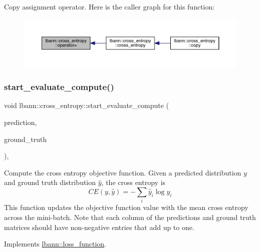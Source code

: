 Copy assignment operator. Here is the caller graph for this function\+:\nopagebreak
\begin{figure}[H]
\begin{center}
\leavevmode
\includegraphics[width=350pt]{classlbann_1_1cross__entropy_a818f473e9af3e417dfdf2c79f8f2c2af_icgraph}
\end{center}
\end{figure}
\mbox{\label{classlbann_1_1cross__entropy_a5167b7709499516c6a4dbebfc561f6a7}} 
\subsubsection{\texorpdfstring{start\+\_\+evaluate\+\_\+compute()}{start\_evaluate\_compute()}}
{\footnotesize\ttfamily void lbann\+::cross\+\_\+entropy\+::start\+\_\+evaluate\+\_\+compute (\begin{DoxyParamCaption}\item[{const \hyperlink{base_8hpp_a9a697a504ae84010e7439ffec862b470}{Abs\+Dist\+Mat} \&}]{prediction,  }\item[{const \hyperlink{base_8hpp_a9a697a504ae84010e7439ffec862b470}{Abs\+Dist\+Mat} \&}]{ground\+\_\+truth }\end{DoxyParamCaption})\hspace{0.3cm}{\ttfamily [override]}, {\ttfamily [virtual]}}

Compute the cross entropy objective function. Given a predicted distribution $y$ and ground truth distribution $\hat{y}$, the cross entropy is \[ CE(y,\hat{y}) = - \sum\limits_{i} \hat{y}_i \log y_i \] This function updates the objective function value with the mean cross entropy across the mini-\/batch. Note that each column of the predictions and ground truth matrices should have non-\/negative entries that add up to one. 

Implements \hyperlink{classlbann_1_1loss__function_a0bbe41060d788dc7a29f3737761a6f7d}{lbann\+::loss\+\_\+function}.



